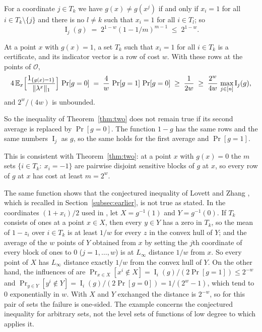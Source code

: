 \documentclass[11pt,reqno]{amsart}
\makeatletter
\theoremstyle{definition}
\theoremstyle{remark}
\numberwithin{equation}{section}
\theoremstyle{named}
\theoremstyle{plain}
\renewcommand{\subsection}{\@startsection{subsection}{2}%
  \z@{1.0\linespacing\@plus.4\linespacing\@minus.15\linespacing}{-.5em}{\normalfont\bfseries}}
\newcommand{\E}{\mathbb{E}}
\newcommand{\I}{\operatorname{I}}
\newcommand{\cO}{\mathcal{O}}
\newcommand{\norm}[1]{\lVert #1\rVert_1}
\makeatother
\begin{document}
For a coordinate $j\in T_k$ we have $g(x)\ne g(x^{j})$ if and only if
$x_i=1$ for all $i\in T_k\setminus\{j\}$ and there is no $l\ne k$ such that $x_i=1$ for all $i\in T_l$;
so
\[
   \I_j(g)\;=\;2^{1-w}(1-1/m)^{m-1}\;\le\;2^{1-w}.
\]

At a point $x$ with $g(x)=1$, a set $T_k$ such that
$x_i=1$ for all $i\in T_k$ is a certificate, and its indicator vector is a row of cost $w$. With these
rows at the points of $\cO$,
\[
   4\,\E_x\Bigl[\frac{1_{\{g(x)=1\}}}{\norm{\lambda^{x}}}\Bigr]\,\Pr[g=0]
   \;=\;\frac{4}{w}\,\Pr[g=1]\,\Pr[g=0]\;\ge\;\frac{1}{2w}\;\ge\;\frac{2^{w}}{4w}\,\max_{j\in[n]}\I_j(g),
\]
and $2^{w}/(4w)$ is unbounded.

So the inequality of Theorem~\ref{thm:two} does not remain true if its
second average is replaced by $\Pr[g=0]$. The function $1-g$ has the same rows and the same numbers
$\I_j$ as $g$, so the same holds for the first average and $\Pr[g=1]$.

This is consistent with
Theorem~\ref{thm:two}: at a point $x$ with $g(x)=0$ the $m$ sets $\{i\in T_k:\ x_i=-1\}$ are pairwise
disjoint sensitive blocks of $g$ at $x$, so every row of $g$ at $x$ has cost at least $m=2^{w}$.

The same function shows that the conjectured inequality of Lovett and Zhang
\cite[Conjecture~37]{LZ}, which is recalled in Section~\ref{subsec:earlier}, is not true as stated.
In the coordinates $(1+x_i)/2$ used in \cite{LZ}, let $X=g^{-1}(1)$ and $Y=g^{-1}(0)$. If $T_k$
consists of ones at a point $x\in X$, then every $y\in Y$ has a zero in $T_k$, so the mean of
$1-z_i$ over $i\in T_k$ is at least $1/w$ for every $z$ in the convex hull of $Y$; and the average of
the $w$ points of $Y$ obtained from $x$ by setting the $j$th coordinate of every block of ones to $0$
($j=1,\dots,w$) is at $L_\infty$ distance $1/w$ from $x$. So every point of $X$ has $L_\infty$
distance exactly $1/w$ from the convex hull of $Y$. On the other hand, the influences of
\cite[Definition~36]{LZ} are $\Pr_{x\in X}[x^{i}\notin X]=\I_i(g)/(2\Pr[g=1])\le2^{-w}$ and
$\Pr_{y\in Y}[y^{i}\notin Y]=\I_i(g)/(2\Pr[g=0])=1/(2^{w}-1)$, which tend to $0$ exponentially in $w$.
With $X$ and $Y$ exchanged the distance is $2^{-w}$, so for this pair of sets the failure is
one-sided. The example concerns the conjectured inequality for arbitrary sets, not the level sets of
functions of low degree to which \cite[Claim~38]{LZ} applies it.

\subsection{The exponent of the variance}\label{subsec:degone}
\end{document}
